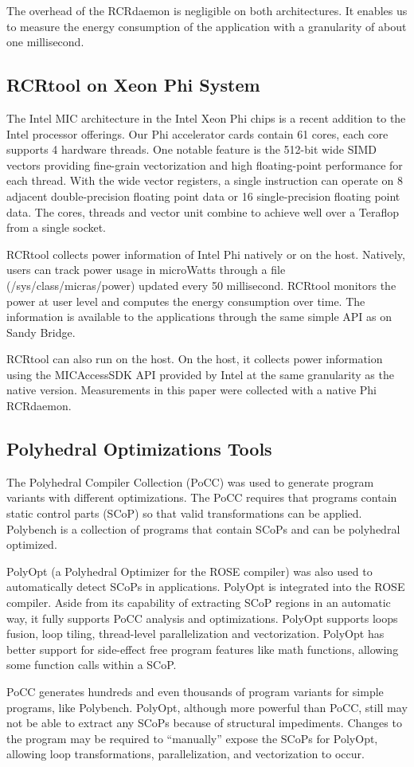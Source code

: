 The overhead of the RCRdaemon is negligible on both architectures.  
It enables us to measure the energy consumption of the application 
with a granularity of about one millisecond. 

\subsection{RCRtool on Xeon Phi System}
The Intel MIC architecture in the Intel Xeon Phi chips is a recent addition to the
Intel processor offerings.
Our Phi accelerator cards contain 61 cores, each core supports 4 hardware threads. 
One notable feature is the 512-bit wide SIMD vectors providing fine-grain
vectorization and high floating-point performance for each thread.
With the wide vector registers, a single 
instruction can operate on 8 adjacent double-precision floating point data or 16 
single-precision floating point data. The cores, threads and vector unit combine
to achieve well over a Teraflop from a single socket.

RCRtool collects power information of Intel Phi natively
or on the host. Natively, users can track power usage in microWatts through    
a file (/sys/class/micras/power) updated every 50 millisecond.
RCRtool monitors the power at user level and computes the energy
consumption over time.
The information is available to the applications through the same simple API as on
Sandy Bridge.

RCRtool can also run on the host. On the host, it collects
power information using the MICAccessSDK API provided by Intel at the same 
granularity as the native version. 
Measurements in this paper were collected with a native Phi RCRdaemon.
 
\subsection{Polyhedral Optimizations Tools}
The Polyhedral Compiler Collection (PoCC)\cite{PoCC} was used to generate program 
variants with different optimizations.
The PoCC requires that programs contain static control parts (SCoP)\cite{SCoP1,SCoP2} so that 
valid transformations can be applied. Polybench is a collection of programs
that contain SCoPs and can be polyhedral optimized.  

PolyOpt (a Polyhedral Optimizer for the ROSE compiler)\cite{Polyopt} was also used to 
automatically detect SCoPs in applications. PolyOpt is integrated into the ROSE compiler.
Aside from its capability of extracting SCoP regions in an automatic way, it fully
supports PoCC analysis and optimizations. PolyOpt supports 
loops fusion, loop tiling, thread-level parallelization and vectorization. PolyOpt
has better support for side-effect free program features like math 
functions\cite{Math-Poly}, allowing some function calls within a SCoP.

PoCC generates hundreds and even thousands of program variants for simple programs, like Polybench.
PolyOpt, although more powerful than PoCC, still may not be able to extract any SCoPs
because of structural impediments. Changes to the program
may be required to  ``manually'' expose the SCoPs for PolyOpt, allowing 
loop transformations, parallelization, and vectorization to occur.
